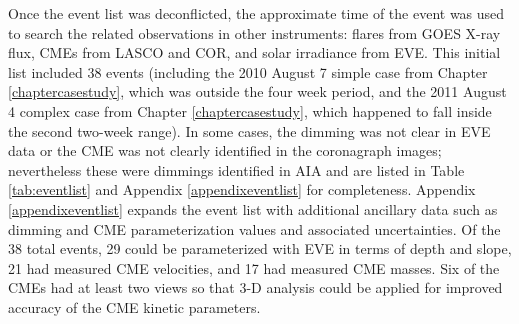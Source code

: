 Once the event list was deconflicted, the approximate time of the event was used to search the related observations in other instruments: flares from GOES X-ray flux, CMEs from LASCO and COR, and solar irradiance from EVE. This initial list included 38 events (including the 2010 August 7 simple case from Chapter \ref{chaptercasestudy}, which was outside the four week period, and the 2011 August 4 complex case from Chapter \ref{chaptercasestudy}, which happened to fall inside the second two-week range). In some cases, the dimming was not clear in EVE data or the CME was not clearly identified in the coronagraph images; nevertheless these were dimmings identified in AIA and are listed in Table \ref{tab:eventlist} and Appendix \ref{appendixeventlist} for completeness. Appendix \ref{appendixeventlist} expands the event list with additional ancillary data such as dimming and CME parameterization values and associated uncertainties. Of the 38 total events, 29 could be parameterized with EVE in terms of depth and slope, 21 had measured CME velocities, and 17 had measured CME masses. Six of the CMEs had at least two views so that 3-D analysis could be applied for improved accuracy of the CME kinetic parameters.

